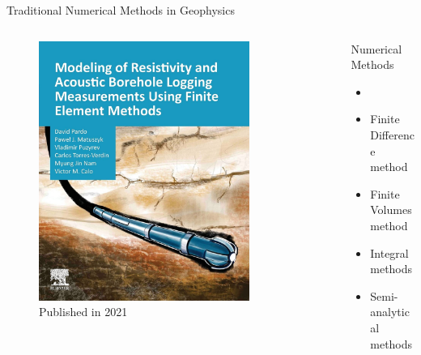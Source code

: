 \begin{frame}{Traditional Numerical Methods in Geophysics}
  \begin{columns}[T,onlytextwidth]
  
    \begin{column}{0.48\textwidth}
      \begin{figure}
        \centering %
        \includegraphics[width=0.8\textwidth]{Diapos/Intro/Figures/PardoBook.jpg} %
        \caption{Published in 2021} %
        \label{fig:book} %
      \end{figure}
    \end{column}
    
   \begin{column}{0.48\textwidth}
  \begin{block}{Numerical Methods}
    \begin{itemize}
      \setlength\itemsep{2.3em} %
      \item {}
      \item Finite Difference method
      \item Finite Volumes method
      \item Integral methods
      \item Semi-analytical methods
    \end{itemize}
  \end{block}
\end{column}

    
  \end{columns}
\end{frame}
